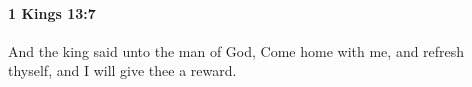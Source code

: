 
		\paragraph{1 Kings 13:7} %
			\label{1KINGS-13-7}

			And the king said unto the man of God, Come home with me, and refresh thyself, and I will give thee a reward.


